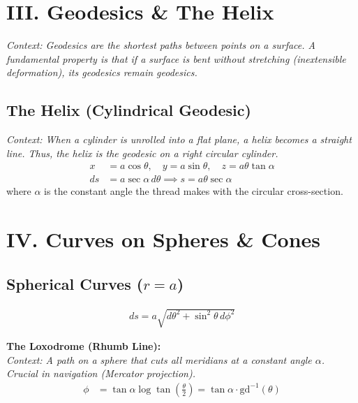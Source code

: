 \documentclass[11pt, a4paper]{article}
\begin{document}
\vspace{0.3cm}

\section*{\color{primary} III. Geodesics \& The Helix}

\textit{\small Context: Geodesics are the shortest paths between points on a surface. A fundamental property is that if a surface is bent without stretching (inextensible deformation), its geodesics remain geodesics.}

\subsection*{\color{secondary} The Helix (Cylindrical Geodesic)}
\textit{\small Context: When a cylinder is unrolled into a flat plane, a helix becomes a straight line. Thus, the helix is the geodesic on a right circular cylinder.}
\begin{align*}
    x &= a \cos \theta, \quad y = a \sin \theta, \quad z = a \theta \tan \alpha \\
    ds &= a \sec \alpha \, d\theta \implies s = a \theta \sec \alpha
\end{align*}
where $\alpha$ is the constant angle the thread makes with the circular cross-section.


\section*{\color{primary} IV. Curves on Spheres \& Cones}

\subsection*{\color{secondary} Spherical Curves ($r=a$)}
\begin{align*}
    ds = a \sqrt{d\theta^2 + \sin^2\theta \, d\phi^2}
\end{align*}

\textbf{\color{accent}The Loxodrome (Rhumb Line):}\\
\textit{\small Context: A path on a sphere that cuts all meridians at a constant angle $\alpha$. Crucial in navigation (Mercator projection).}
\begin{align*}
    \phi &= \tan \alpha \log \tan\left(\frac{\theta}{2}\right) = \tan \alpha \cdot \text{gd}^{-1}(\theta)
\end{align*}
\end{document}
